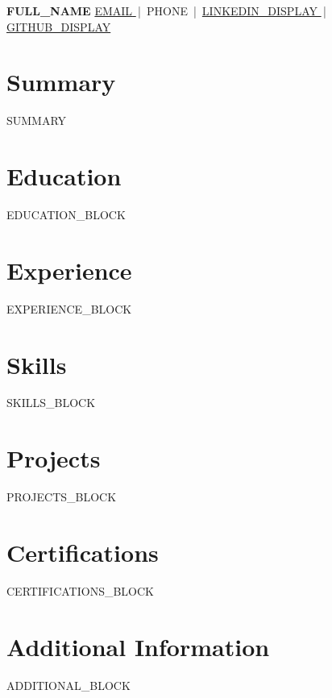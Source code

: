 \documentclass[a4paper,10pt]{article}
\begin{document}
\begin{center}
  {\large\textbf{ {{FULL_NAME}} }} \quad
  {\small
    \href{mailto:{{EMAIL}}}{ {{EMAIL}} } \,|\, {{PHONE}} \,|\,
    \href{ {{LINKEDIN_URL}} }{ {{LINKEDIN_DISPLAY}} } \,|\,
    \href{ {{GITHUB_URL}} }{ {{GITHUB_DISPLAY}} }
  }
\end{center}
\vspace{2pt}

\section*{Summary}
\small {{SUMMARY}}

\section*{Education}
\small
{{EDUCATION_BLOCK}}

\section*{Experience}
\small
{{EXPERIENCE_BLOCK}}

\section*{Skills}
\small
{{SKILLS_BLOCK}}

\section*{Projects}
\small
{{PROJECTS_BLOCK}}

\section*{Certifications}
\small
{{CERTIFICATIONS_BLOCK}}

\section*{Additional Information}
\small
{{ADDITIONAL_BLOCK}}
\end{document}
